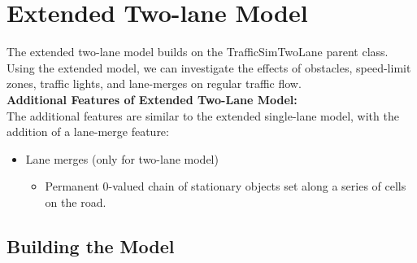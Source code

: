 \documentclass[11pt]{article}
\providecommand{\tightlist}{%
      \setlength{\itemsep}{0pt}\setlength{\parskip}{0pt}}
\begin{document}
\section{Extended Two-lane Model}

The extended two-lane model builds on the TrafficSimTwoLane parent
class. Using the extended model, we can investigate the effects of
obstacles, speed-limit zones, traffic lights, and lane-merges on regular
traffic flow.\\

\textbf{Additional Features of Extended Two-Lane Model:}\\

The additional features are similar to the extended single-lane model,
with the addition of a lane-merge feature:

\begin{itemize}
\tightlist
\item
  Lane merges (only for two-lane model)

  \begin{itemize}
  \tightlist
  \item
    Permanent 0-valued chain of stationary objects set along a series of
    cells on the road.
  \end{itemize}
\end{itemize}

    \subsection{Building the Model}
\end{document}
